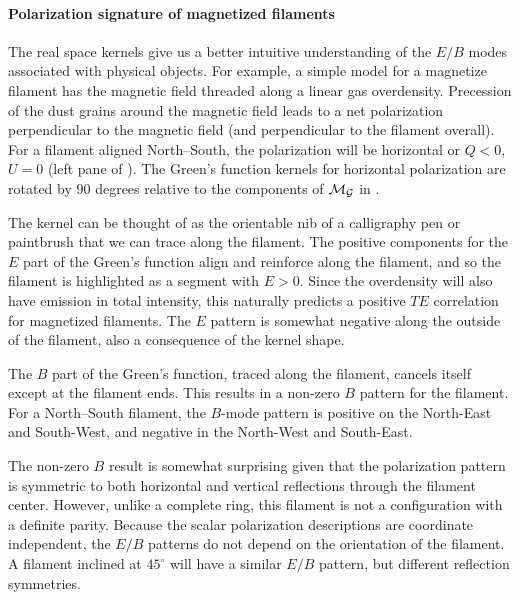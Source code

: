 \paragraph{Polarization signature of magnetized filaments}
The real space kernels give us a better intuitive understanding of the $E/B$ modes associated with physical objects.  For example, a simple model for a magnetize filament has the magnetic field threaded along a linear gas overdensity.  Precession of the dust grains around the magnetic field leads to a net polarization perpendicular to the magnetic field (and perpendicular to the filament overall).  For a filament aligned North--South, the polarization will be horizontal or $Q<0$, $U=0$ (left pane of ).  The Green's function kernels for horizontal polarization are rotated by 90 degrees relative to the components of $\cal{M}_G$ in .

The kernel can be thought of as the orientable nib of a calligraphy pen or paintbrush that we can trace along the filament.  The positive components for the $E$ part of the Green's function align and reinforce along the filament, and so the filament is highlighted as a segment with $E>0$.  Since the overdensity will also have emission in total intensity, this naturally predicts a positive $TE$ correlation for magnetized filaments.  The $E$ pattern is somewhat negative along the outside of the filament, also a consequence of the kernel shape.

The $B$ part of the Green's function, traced along the filament, cancels itself except at the filament ends.  This results in a non-zero $B$ pattern for the filament.  For a North--South filament, the $B$-mode pattern is positive on the North-East and South-West, and negative in the North-West and South-East.


The non-zero $B$ result is somewhat surprising given that the polarization pattern is symmetric to both horizontal and vertical reflections through the filament center.  However, unlike a complete ring, this filament is not a configuration with a definite parity.  Because the scalar polarization descriptions are coordinate independent, the $E/B$ patterns do not depend on the orientation of the filament.  A filament inclined at $45^\circ$ will have a similar $E/B$ pattern, but different reflection symmetries.  


